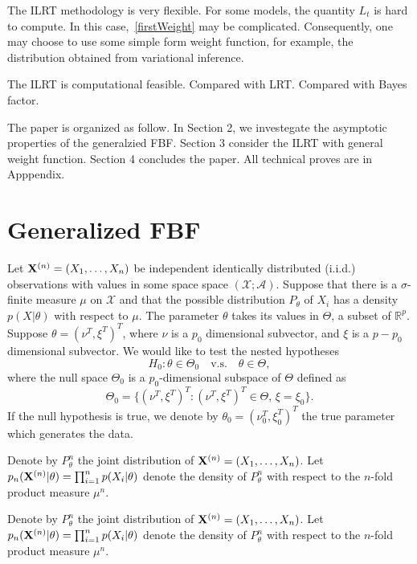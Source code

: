\documentclass[3p]{elsarticle}
\theoremstyle{plain}
\theoremstyle{definition}
\theoremstyle{remark}
\begin{document}
The ILRT methodology is very flexible.
For some models, the quantity $L_t$ is hard to compute.
In this case,~\eqref{firstWeight} may be complicated.
Consequently, one may choose to use some simple form weight function, for example, the distribution obtained from variational inference.


The ILRT is computational feasible. Compared with LRT. Compared with Bayes factor.

The paper is organized as follow.
In Section 2, we investegate the asymptotic properties of the generalzied FBF.
Section 3 consider the ILRT with general weight function.
Section 4 concludes the paper.
All technical proves are in Apppendix.


\section{Generalized FBF}

Let $\mathbf{X}^{(n)}=(X_1,\ldots,X_n)$ be independent identically distributed (i.i.d.) observations with values in some space space $(\mathcal{X};\mathscr{A})$.
Suppose that there is a $\sigma$-finite measure $\mu$ on $\mathcal{X}$ and that the  possible distribution $P_\theta$ of $X_i$ has a density $p(X|\theta)$ with respect to $\mu$.
The parameter $\theta$ takes its values in $\Theta$, a subset of $\mathbb{R}^{p}$.
Suppose $\theta=(\nu^T,\xi^T)^T$, where $\nu$ is a $p_0$ dimensional subvector, and $\xi$ is a $p-p_0$ dimensional subvector.
 We would like to test the nested hypotheses
\begin{equation*}
    H_0:\theta\in\Theta_0\quad \text{v.s.}\quad \theta\in\Theta,
\end{equation*}
where the null space $\Theta_0$ is a $p_0$-dimensional subspace of $\Theta$ defined as
\begin{equation*}
    \Theta_0=\{(\nu^T,\xi^T)^T:(\nu^T,\xi^T)^T\in\Theta, \, \xi=\xi_0\}.
\end{equation*}
If the null hypothesis is true, we denote by $\theta_0=(\nu_0^T,\xi_0^T)^T$ the true parameter which generates the data.

Denote by $P_{\theta}^{n}$ the joint distribution of $\mathbf{X}^{(n)}=(X_1,\ldots, X_n)$.
Let $p_{n}(\mathbf{X}^{(n)}|\theta)=\prod_{i=1}^n p(X_i|\theta)$ denote the density of $P_{\theta}^n$ with respect to the $n$-fold product measure $\mu^n$.

Denote by $P_{\theta}^{n}$ the joint distribution of $\mathbf{X}^{(n)}=(X_1,\ldots, X_n)$.
Let $p_{n}(\mathbf{X}^{(n)}|\theta)=\prod_{i=1}^n p(X_i|\theta)$ denote the density of $P_{\theta}^n$ with respect to the $n$-fold product measure $\mu^n$.
\end{document}
